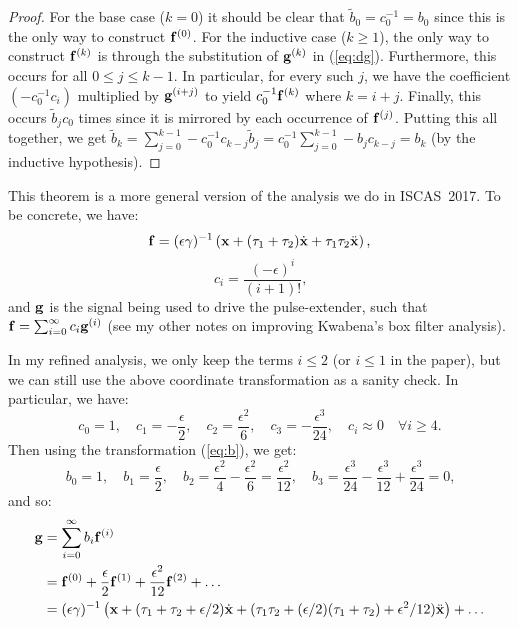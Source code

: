 \begin{proof}
For the base case ($k = 0$) it should be clear that $\tilde{b}_0 = c_0^{-1} = b_0$ since this is the only way to construct $\mathbf{f}^{(0)}$.
For the inductive case ($k \ge 1$), the only way to construct $\mathbf{f}^{(k)}$ is through the substitution of $\mathbf{g}^{(k)}$ in (\ref{eq:dg}).
Furthermore, this occurs for all $0 \le j \le k - 1$. In particular, for every such $j$, we have the coefficient $(-c_0^{-1} c_{i})$ multiplied by $\mathbf{g}^{(i + j)}$ to yield $c_0^{-1} \mathbf{f}^{(k)}$ where $k = i + j$.
Finally, this occurs $\tilde{b}_{j} c_0$ times since it is mirrored by each occurrence of $\mathbf{f}^{(j)}$.
Putting this all together, we get $\tilde{b}_k = \sum_{j=0}^{k-1} -c_0^{-1} c_{k - j} \tilde{b}_j = c_0^{-1} \sum_{j=0}^{k-1} - b_j c_{k - j} = b_k$ (by the inductive hypothesis).
\end{proof}


This theorem is a more general version of the analysis we do in ISCAS~2017. To be concrete, we have:
$$
\mathbf{f} = (\epsilon \gamma)^{-1} \left( \mathbf{x} + (\tau_1 + \tau_2) \dot{\mathbf{x}} + \tau_1 \tau_2 \ddot{\mathbf{x}} \right) \text{,}
$$
$$
c_i = \frac{(-\epsilon)^i}{(i + 1)!} \text{,}
$$
and $\mathbf{g}$ is the signal being used to drive the pulse-extender, such that $\mathbf{f} = \sum_{i=0}^\infty c_i \mathbf{g}^{(i)}$ (see my other notes on improving Kwabena's box filter analysis).

In my refined analysis, we only keep the terms $i \le 2$ (or $i \le 1$ in the paper), but we can still use the above coordinate transformation as a sanity check. In particular, we have:
$$
c_0 = 1, \quad c_1 = -\frac{\epsilon}{2}, \quad c_2 = \frac{\epsilon^2}{6}, \quad c_3 = -\frac{\epsilon^3}{24}, \quad c_i \approx 0 \quad \forall i \ge 4 \text{.}
$$
Then using the transformation (\ref{eq:b}), we get:
$$
b_0 = 1, \quad b_1 = \frac{\epsilon}{2}, \quad b_2 = \frac{\epsilon^2}{4} - \frac{\epsilon^2}{6} = \frac{\epsilon^2}{12}, \quad b_3 = \frac{\epsilon^3}{24} - \frac{\epsilon^3}{12} + \frac{\epsilon^3}{24} = 0 \text{,}
$$
and so:
\begin{align*}
\mathbf{g} &= \sum_{i=0}^\infty b_i \mathbf{f}^{(i)} \\
        &= \mathbf{f}^{(0)} + \frac{\epsilon}{2} \mathbf{f}^{(1)} + \frac{\epsilon^2}{12} \mathbf{f}^{(2)} + \ldots \\
        &= (\epsilon \gamma)^{-1} \left( \mathbf{x} + (\tau_1 + \tau_2 + \epsilon / 2) \dot{\mathbf{x}} + (\tau_1 \tau_2 + (\epsilon / 2 ) (\tau_1 + \tau_2) + \epsilon^2 / 12) \ddot{\mathbf{x}} \right) + \ldots
\end{align*}

